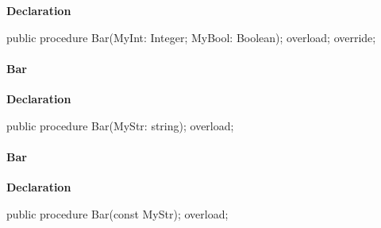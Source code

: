 \documentclass{report}
\begin{document}
\begin{list}{}{
\setlength{\itemindent}{0cm}
\setlength{\listparindent}{0cm}
\setlength{\leftmargin}{\evensidemargin}
\addtolength{\leftmargin}{\tmplength}
\settowidth{\labelsep}{X}
\addtolength{\leftmargin}{\labelsep}
\setlength{\labelwidth}{\tmplength}
}
\begin{flushleft}
\item[\textbf{Declaration}\hfill]
\begin{ttfamily}
public procedure Bar(MyInt: Integer; MyBool: Boolean); overload; override;\end{ttfamily}


\end{flushleft}
\end{list}
\paragraph*{Bar}\hspace*{\fill}

\begin{list}{}{
\setlength{\itemindent}{0cm}
\setlength{\listparindent}{0cm}
\setlength{\leftmargin}{\evensidemargin}
\addtolength{\leftmargin}{\tmplength}
\settowidth{\labelsep}{X}
\addtolength{\leftmargin}{\labelsep}
\setlength{\labelwidth}{\tmplength}
}
\begin{flushleft}
\item[\textbf{Declaration}\hfill]
\begin{ttfamily}
public procedure Bar(MyStr: string); overload;\end{ttfamily}


\end{flushleft}
\end{list}
\paragraph*{Bar}\hspace*{\fill}

\begin{list}{}{
\setlength{\itemindent}{0cm}
\setlength{\listparindent}{0cm}
\setlength{\leftmargin}{\evensidemargin}
\addtolength{\leftmargin}{\tmplength}
\settowidth{\labelsep}{X}
\addtolength{\leftmargin}{\labelsep}
\setlength{\labelwidth}{\tmplength}
}
\begin{flushleft}
\item[\textbf{Declaration}\hfill]
\begin{ttfamily}
public procedure Bar(const MyStr); overload;\end{ttfamily}


\end{flushleft}
\end{list}
\end{document}
